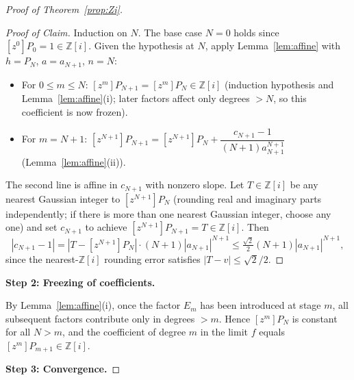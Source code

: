 \documentclass[12pt]{amsart}
\theoremstyle{definition}
\newcommand{\Zi}{\mathbb{Z}[i]}
\newcommand{\abs}[1]{\left|#1\right|}
\begin{document}
\begin{proof}[Proof of Theorem~\ref{prop:Zi}]
\begin{proof}[Proof of Claim]
Induction on $N$.  The base case $N=0$ holds since $[z^0]P_0 = 1 \in
\Zi$.  Given the hypothesis at $N$, apply Lemma~\ref{lem:affine} with
$h = P_N$, $a = a_{N+1}$, $n = N$:
\begin{itemize}
  \item For $0 \leq m \leq N$: $[z^m]P_{N+1} = [z^m]P_N \in \Zi$
        (induction hypothesis and Lemma~\ref{lem:affine}(i); later
        factors affect only degrees $> N$, so this coefficient is now
        frozen).
  \item For $m = N+1$:
    $[z^{N+1}]P_{N+1} = [z^{N+1}]P_N + \dfrac{c_{N+1}-1}{(N+1)a_{N+1}^{N+1}}$
    (Lemma~\ref{lem:affine}(ii)).
\end{itemize}
The second line is affine in $c_{N+1}$ with nonzero slope.  Let $T \in
\Zi$ be any nearest Gaussian integer to $[z^{N+1}]P_N$ (rounding real
and imaginary parts independently; if there is more than one nearest
Gaussian integer, choose any one) and set
$c_{N+1}$ to achieve $[z^{N+1}]P_{N+1} = T \in \Zi$.  Then
\[
  \abs{c_{N+1}-1}
  = \abs{T - [z^{N+1}]P_N} \cdot (N+1)\abs{a_{N+1}}^{N+1}
  \leq \tfrac{\sqrt{2}}{2}(N+1)\abs{a_{N+1}}^{N+1},
\]
since the nearest-$\Zi$ rounding error satisfies $\abs{T-v} \leq
\sqrt{2}/2$.
\end{proof}

\medskip\noindent\textbf{Step 2: Freezing of coefficients.}

By Lemma~\ref{lem:affine}(i), once the factor $E_m$ has been introduced
at stage $m$, all subsequent factors contribute only in degrees $> m$.
Hence $[z^m]P_N$ is constant for all $N > m$, and the coefficient of
degree $m$ in the limit $f$ equals $[z^m]P_{m+1} \in \Zi$.

\medskip\noindent\textbf{Step 3: Convergence.}


\end{proof}
\end{document}
